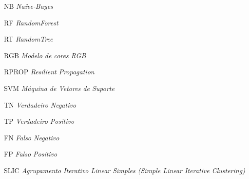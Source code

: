 \begin{siglas}

\item[{NB}] \emph{Na\"{i}ve-Bayes}


\item[{RF}] \emph{RandomForest}
\item[{RT}] \emph{RandomTree}
\item[{RGB}] \emph{Modelo de cores RGB}
\item[{RPROP}] \emph{Resilient Propagation}
\item[{SVM}] \emph{Máquina de Vetores de Suporte}


\item[TN] \emph{Verdadeiro Negativo}
\item[TP] \emph{Verdadeiro Positivo}

\item[FN] \emph{Falso Negativo}
\item[FP] \emph{Falso Positivo}



\item[{SLIC}] \emph{Agrupamento Iterativo Linear Simples (Simple Linear Iterative Clustering)}


\end{siglas}